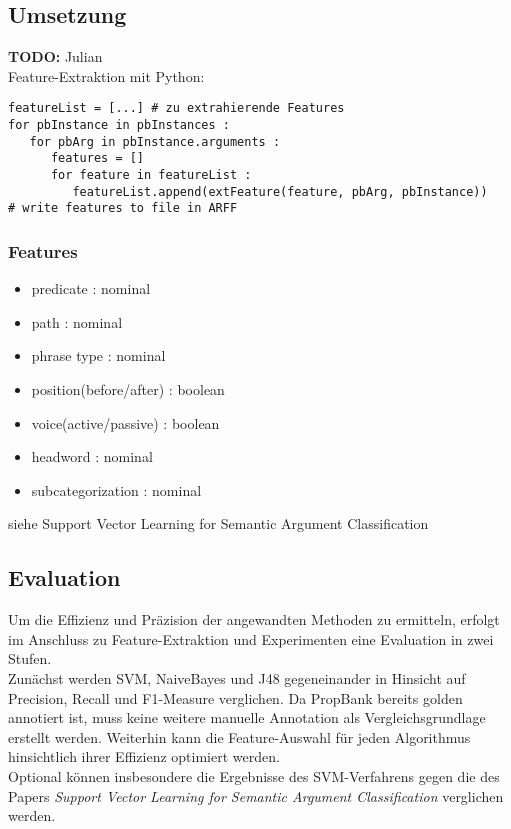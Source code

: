 \documentclass[runningheads]{llncs}
\begin{document}
\subsection{Umsetzung}
\textbf{TODO:} Julian\\
Feature-Extraktion mit Python:
\begin{lstlisting}[frame=lines]
featureList = [...] # zu extrahierende Features
for pbInstance in pbInstances :
   for pbArg in pbInstance.arguments :
      features = []
      for feature in featureList :
         featureList.append(extFeature(feature, pbArg, pbInstance))
# write features to file in ARFF
\end{lstlisting}

\subsubsection{Features}
\begin{itemize}
\item predicate : nominal
\item path : nominal
\item phrase type : nominal
\item position(before/after) : boolean
\item voice(active/passive) : boolean
\item headword : nominal
\item subcategorization : nominal
\end{itemize}
siehe Support Vector Learning for Semantic Argument Classiﬁcation\cite{svm}

\subsection{Evaluation}
Um die Effizienz und Pr\"azision der angewandten Methoden zu ermitteln, erfolgt im Anschluss zu Feature-Extraktion und Experimenten eine Evaluation in zwei Stufen.\\
Zun\"achst werden SVM, NaiveBayes und J48 gegeneinander in Hinsicht auf Precision, Recall und F1-Measure verglichen. Da PropBank bereits golden annotiert ist, muss keine weitere manuelle Annotation als Vergleichsgrundlage erstellt werden. Weiterhin kann die Feature-Auswahl f\"ur jeden Algorithmus hinsichtlich ihrer Effizienz optimiert werden.\\
Optional k\"onnen insbesondere die Ergebnisse des SVM-Verfahrens gegen die des Papers \textit{Support Vector Learning for Semantic Argument Classiﬁcation}\cite{svm} verglichen werden.
\end{document}

